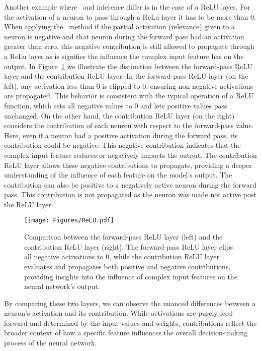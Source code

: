 Another example where \CTC\ and inference differ is in the case of a ReLU layer. For the activation of a neuron to pass through a ReLu layer it has to be more than 0. When applying the \CTC\ method if the partial activation (\ie relevance) given to a neuron is negative and that neuron during the forward pass had an activation greater than zero, this negative contribution is still allowed to propagate through a ReLu layer as is signifies the influence the complex input feature has on the output. In Figure~\ref{Fig:Relu} we illustrate the distinction between the forward-pass ReLU layer and the contribution ReLU layer. In the forward-pass ReLU layer (on the left), any activation less than 0 is clipped to 0, ensuring non-negative activations are propagated. This behavior is consistent with the typical operation of a ReLU function, which sets all negative values to 0 and lets positive values pass unchanged. On the other hand, the contribution ReLU layer (on the right) considers the contribution of each neuron with respect to the forward-pass value. Here, even if a neuron had a positive activation during the forward pass, its contribution could be negative. This negative contribution indicates that the complex input feature reduces or negatively impacts the output. The contribution ReLU layer allows these negative contributions to propagate, providing a deeper understanding of the influence of each feature on the model's output. The contribution can also be positive to a negatively active neuron during the forward pass. This contribution is not propagated as the neuron was made not active post the ReLU layer. 


\begin{figure}[ht!]
	\begin{center}
		\texttt{[image: Figures/ReLU.pdf]}
	\end{center}
	\caption{Comparison between the forward-pass ReLU layer (left) and the contribution ReLU layer (right). The forward-pass ReLU layer clips all negative activations to 0, while the contribution ReLU layer evaluates and propagates both positive and negative contributions, providing insights into the influence of complex input features on the neural network's output.}
	\label{Fig:Relu}
\end{figure} 

By comparing these two layers, we can observe the nuanced differences between a neuron's activation and its contribution. While activations are purely feed-forward and determined by the input values and weights, contributions reflect the broader context of how a specific feature influences the overall decision-making process of the neural network.

